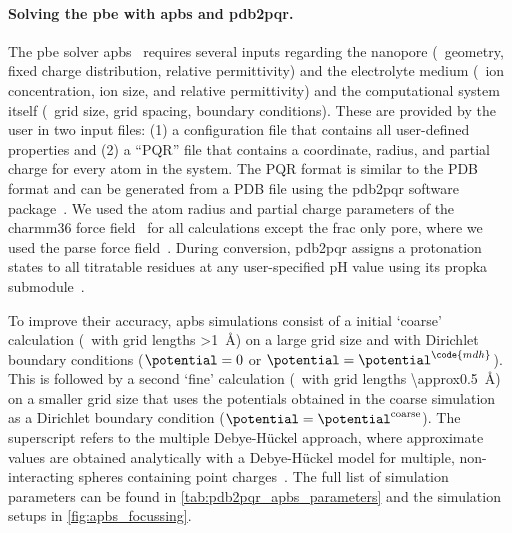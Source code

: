 \paragraph{Solving the \gls{pbe} with \gls{apbs} and \gls{pdb2pqr}.}
%
The \gls{pbe} solver \gls{apbs}~\cite{Jurrus-2018,Baker-2001} requires several inputs regarding the nanopore
(\ie~geometry, fixed charge distribution, relative permittivity) and the electrolyte medium (\ie~ion
concentration, ion size, and relative permittivity) and the computational system itself (\ie~grid size, grid
spacing, boundary conditions). These are provided by the user in two input files: (1) a configuration file
that contains all user-defined properties and (2) a ``PQR'' file that contains a coordinate, radius, and
partial charge for every atom in the system. The PQR format is similar to the PDB format and can be generated
from a PDB file using the \gls{pdb2pqr} software package~\cite{Jurrus-2018,Dolinsky-2004,Dolinsky-2007}. We
used the atom radius and partial charge parameters of the \gls{charmm36} force field~\cite{Huang-2013} for all
calculations except the \gls{frac} only pore, where we used the \gls{parse} force
field~\cite{Sitkoff-1994,Sitkoff-1996}. During conversion, \gls{pdb2pqr} assigns a protonation states to all
titratable residues at any user-specified pH value using its \gls{propka} submodule~\cite{Li-2005}.

To improve their accuracy, \gls{apbs} simulations consist of a initial `coarse' calculation (\ie~with grid
lengths \SI{>1}{\angstrom}) on a large grid size and with Dirichlet boundary conditions ($\potential = 0$ or
$\potential = \potential^{\code{mdh}}$). This is followed by a second `fine' calculation (\ie~with grid
lengths \SI{\approx0.5}{\angstrom}) on a smaller grid size that uses the potentials obtained in the coarse
simulation as a Dirichlet boundary condition ($\potential = \potential^{\mathrm{coarse}}$). The 
superscript refers to the multiple Debye-H\"{u}ckel approach, where approximate values are obtained
analytically with a Debye-H\"{u}ckel model for multiple, non-interacting spheres containing point
charges~\cite{Baker-2001,Baker-2005,Stone-2010}. The full list of simulation parameters can be found in
\cref{tab:pdb2pqr_apbs_parameters} and the simulation setups in \cref{fig:apbs_focussing}.

